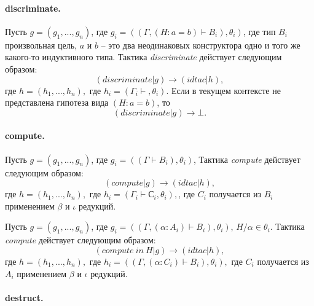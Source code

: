 \documentclass[12pt]{article}
\begin{document}
\paragraph{discriminate.}
Пусть $g = (g_1, ..., g_n)$, где $g_i = ((\Gamma, (H: a = b) \vdash B_i), \theta_i)$, где тип $B_i$ произвольная цель, $a$ и $b$ -- это два неодинаковых конструктора одно и того же какого-то индуктивного типа.
Тактика \textit{discriminate} действует следующим образом:
$$(discriminate|g) \xrightarrow{} (idtac| h),$$
где $h=(h_1, ...,h_n),$ где $h_i= (\Gamma_i \vdash , \theta_i)$.
Если в текущем контексте не представлена гипотеза вида $(H:a=b)$, то 
$$(discriminate|g) \xrightarrow{} \bot.$$

\paragraph{compute.}
Пусть $g = (g_1, ..., g_n)$, где $g_i = ((\Gamma \vdash B_i), \theta_i)$,
Тактика \textit{compute} действует следующим образом:
$$(compute|g) \xrightarrow{} (idtac| h),$$
где $h=(h_1, ...,h_n),$ где $h_i= (\Gamma_i \vdash  С_i , \theta_i),$, где $C_i$ получается из $B_i$ применением $\beta$ и $\iota$ редукций.

Пусть $g = (g_1, ..., g_n)$, где $g_i = ((\Gamma, (\alpha: A_i) \vdash B_i), \theta_i)$, $H/\alpha \in \theta_i$.
Тактика \textit{compute} действует следующим образом:
$$(compute\ in\ H|g) \xrightarrow{} (idtac| h),$$
где $h=(h_1, ...,h_n),$ где $h_i= ((\Gamma, (\alpha: C_i) \vdash B_i ), \theta_i),$ где $C_i$ получается из $A_i$ применением $\beta$ и $\iota$ редукций.

\paragraph{destruct.}
\end{document}
